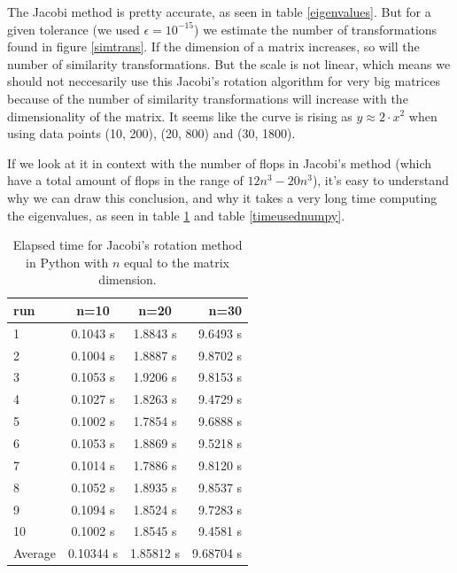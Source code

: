 \documentclass{article}
\begin{document}
The Jacobi method is pretty accurate, as seen in table \ref{eigenvalues}. But for a given tolerance (we used $\epsilon=10^{-15}$) we estimate the number of transformations found in figure \ref{simtrans}. If the dimension of a matrix increases, so will the number of similarity transformations.
But the scale is not linear, which means we should not neccesarily use this Jacobi's rotation algorithm for very big matrices because of the number of similarity transformations will increase with the dimensionality of the matrix. It seems like the curve is rising as $y \approx 2\cdot x^2$ when using data points (10, 200), (20, 800) and (30, 1800).

If we look at it in context with the number of flops in Jacobi's method (which have a total amount of flops in the range of $12n^3 - 20n^3$), it's easy to understand why we can draw this conclusion, and why it takes a very long time computing the eigenvalues, as seen in table \ref{timeusedjacobi} and table \ref{timeusednumpy}.


\begin{table}[H]
    \centering
    \begin{tabular}{|l|c|c|r|}
    \hline
     run & n=10 & n=20 & n=30\\
     \hline
      1  & 0.1043 s & 1.8843 s & 9.6493 s\\
      2  & 0.1004 s & 1.8887 s & 9.8702 s\\
      3  & 0.1053 s & 1.9206 s & 9.8153 s\\
      4  & 0.1027 s & 1.8263 s & 9.4729 s\\
      5  & 0.1002 s & 1.7854 s & 9.6888 s\\
      6  & 0.1053 s & 1.8869 s & 9.5218 s\\
      7  & 0.1014 s & 1.7886 s & 9.8120 s\\
      8  & 0.1052 s & 1.8935 s & 9.8537 s\\
      9  & 0.1094 s & 1.8524 s & 9.7283 s\\
      10 & 0.1002 s & 1.8545 s & 9.4581 s\\
      \hline
      Average & 0.10344 s & 1.85812  s & 9.68704 s\\
      \hline
    \end{tabular}
    \caption{Elapsed time for Jacobi's rotation method in Python with $n$ equal to the matrix dimension.}
    \label{timeusedjacobi}
\end{table}
\end{document}
